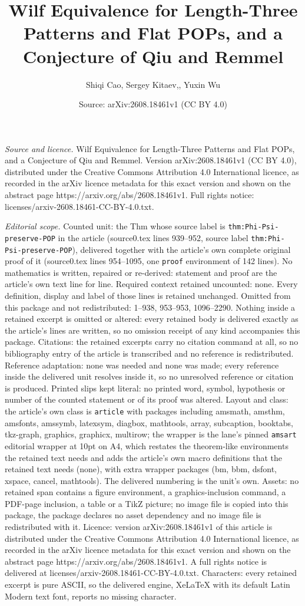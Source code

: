 \documentclass[10pt,a4paper]{amsart}
\title[Wilf Equivalence for Length-Three Patterns and Flat POPs, an]{Wilf Equivalence for Length-Three Patterns and Flat POPs, and a Conjecture of Qiu and Remmel}
\author{Shiqi Cao, Sergey Kitaev,, Yuxin Wu}
\date{Source: arXiv:2608.18461v1 (CC BY 4.0)}
\begin{document}
\maketitle

\noindent\emph{Source and licence.} Wilf Equivalence for Length-Three Patterns and Flat POPs, and a Conjecture of Qiu and Remmel. Version arXiv:2608.18461v1 (CC BY 4.0), distributed under the Creative Commons Attribution 4.0 International licence, as recorded in the arXiv licence metadata for this exact version and shown on the abstract page https://arxiv.org/abs/2608.18461v1. Full rights notice: licenses/arxiv-2608.18461-CC-BY-4.0.txt.\par\smallskip

\noindent\textit{Editorial scope.} Counted unit: the Thm whose source label is \texttt{thm:Phi-Psi-preserve-POP} in the article (source0.tex lines 939--952, source label \texttt{thm:Phi-Psi-preserve-POP}), delivered together with the article's own complete original proof of it (source0.tex lines 954--1095, one \texttt{proof} environment of 142 lines). No mathematics is written, repaired or re-derived: statement and proof are the article's own text line for line. Required context retained uncounted: none. Every definition, display and label of those lines is retained unchanged. Omitted from this package and not redistributed: 1--938, 953--953, 1096--2290. Nothing inside a retained excerpt is omitted or altered: every retained body is delivered exactly as the article's lines are written, so no omission receipt of any kind accompanies this package. Citations: the retained excerpts carry no citation command at all, so no bibliography entry of the article is transcribed and no reference is redistributed. Reference adaptation: none was needed and none was made; every reference inside the delivered unit resolves inside it, so no unresolved reference or citation is produced. Printed slips kept literal: no printed word, symbol, hypothesis or number of the counted statement or of its proof was altered. Layout and class: the article's own class is \texttt{article} with packages including amsmath, amsthm, amsfonts, amssymb, latexsym, diagbox, mathtools, array, subcaption, booktabs, tkz-graph, graphics, graphicx, multirow; the wrapper is the lane's pinned \texttt{amsart} editorial wrapper at 10pt on A4, which restates the theorem-like environments the retained text needs and adds the article's own macro definitions that the retained text needs (none), with extra wrapper packages (bm, bbm, dsfont, xspace, cancel, mathtools). The delivered numbering is the unit's own. Assets: no retained span contains a figure environment, a graphics-inclusion command, a PDF-page inclusion, a table or a TikZ picture; no image file is copied into this package, the package declares no asset dependency and no image file is redistributed with it. Licence: version arXiv:2608.18461v1 of this article is distributed under the Creative Commons Attribution 4.0 International licence, as recorded in the arXiv licence metadata for this exact version and shown on the abstract page https://arxiv.org/abs/2608.18461v1. A full rights notice is delivered at licenses/arxiv-2608.18461-CC-BY-4.0.txt. Characters: every retained excerpt is pure ASCII, so the delivered engine, XeLaTeX with its default Latin Modern text font, reports no missing character.
\end{document}
